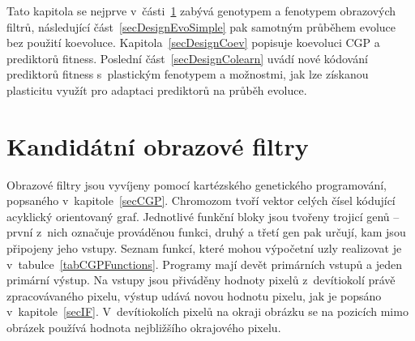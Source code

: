 Tato kapitola se nejprve v~části~\ref{secDesignIF} zabývá genotypem a fenotypem obrazových filtrů, následující část~\ref{secDesignEvoSimple} pak samotným průběhem evoluce bez použití koevoluce. Kapitola~\ref{secDesignCoev} popisuje koevoluci CGP a prediktorů fitness. Poslední část~\ref{secDesignColearn} uvádí nové kódování prediktorů fitness s~plastickým fenotypem a možnostmi, jak lze získanou plasticitu využít pro adaptaci prediktorů na průběh evoluce.

\section{Kandidátní obrazové filtry}
\label{secDesignIF}

Obrazové filtry jsou vyvíjeny pomocí kartézského genetického programování, popsaného v~kapitole~\ref{secCGP}. Chromozom tvoří vektor celých čísel kódující acyklický orientovaný graf. Jednotlivé funkční bloky jsou tvořeny trojicí genů -- první z~nich označuje prováděnou funkci, druhý a třetí gen pak určují, kam jsou připojeny jeho vstupy. Seznam funkcí, které mohou výpočetní uzly realizovat je v~tabulce~\ref{tabCGPFunctions}. Programy mají devět primárních vstupů a jeden primární výstup. Na vstupy jsou přiváděny hodnoty pixelů z~devítiokolí právě zpracovávaného pixelu, výstup udává novou hodnotu pixelu, jak je popsáno v~kapitole~\ref{secIF}. V~devítiokolích pixelů na okraji obrázku se na pozicích mimo obrázek používá hodnota nejbližšího okrajového pixelu.

